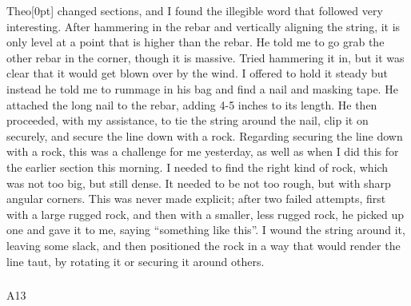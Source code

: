 \documentclass[
]{article}
\makeatletter
\let\oldsubparagraph\subparagraph
\renewcommand{\subparagraph}{
    \@ifstar
      \xxxSubParagraphStar
      \xxxSubParagraphNoStar
  }
\newcommand{\xxxSubParagraphStar}[1]{\oldsubparagraph*{#1}\mbox{}}
\newcommand{\xxxSubParagraphNoStar}[1]{\oldsubparagraph{#1}\mbox{}}
\newcommand{\paragraphnumber}[1]{\marginnote{\color{lightgray}\tiny{#1}}[0pt]}
\makeatother
\begin{document}
Theo\paragraphnumber{[106]} changed sections, and I found the illegible
word that followed very interesting. After hammering in the rebar and
vertically aligning the string, it is only level at a point that is
higher than the rebar. He told me to go grab the other rebar in the
corner, though it is massive. Tried hammering it in, but it was clear
that it would get blown over by the wind. I offered to hold it steady
but instead he told me to rummage in his bag and find a nail and masking
tape. He attached the long nail to the rebar, adding 4-5 inches to its
length. He then proceeded, with my assistance, to tie the string around
the nail, clip it on securely, and secure the line down with a rock.
Regarding securing the line down with a rock, this was a challenge for
me yesterday, as well as when I did this for the earlier section this
morning. I needed to find the right kind of rock, which was not too big,
but still dense. It needed to be not too rough, but with sharp angular
corners. This was never made explicit; after two failed attempts, first
with a large rugged rock, and then with a smaller, less rugged rock, he
picked up one and gave it to me, saying ``something like this''. I wound
the string around it, leaving some slack, and then positioned the rock
in a way that would render the line taut, by rotating it or securing it
around others.

\subparagraph{A13}\label{sec-A13}
\end{document}
